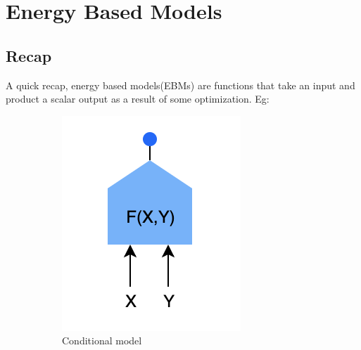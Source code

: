 \chapter{Energy Based Models}

\section{Recap}

A quick recap, energy based models(EBMs) are functions that take an input and product a scalar output as a result of some optimization.
Eg:

\begin{figure}[htb]	
    \centering	
    \begin{subfigure}[b]{0.25\textwidth}	
        \includegraphics[width=\textwidth]{lectures/08-a/images/conditional_EBM.png}	
        \caption{Conditional model}	
        \label{fig:8a_conditional}	
    \end{subfigure}	
    \begin{subfigure}[b]{0.25\textwidth}	

\end{subfigure}
\end{figure}
